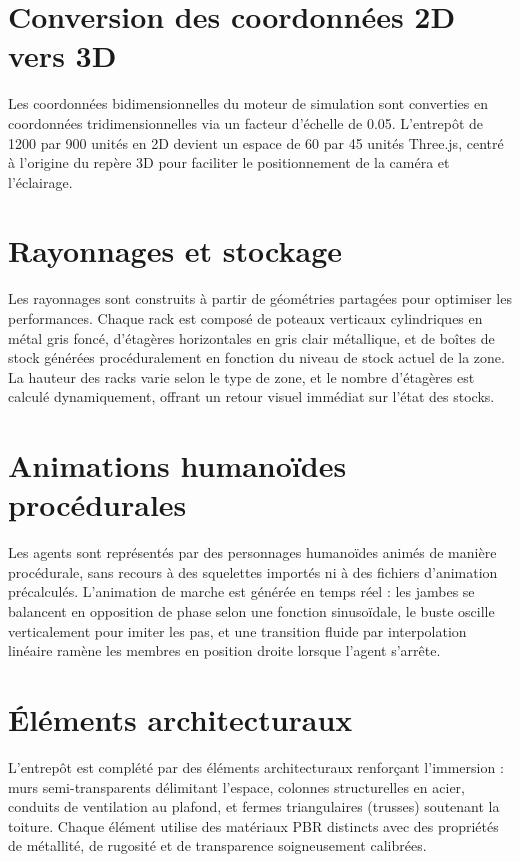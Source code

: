 \documentclass[12pt,a4paper]{report}
\begin{document}
\section{Conversion des coordonn\'ees 2D vers 3D}

Les coordonn\'ees bidimensionnelles du moteur de simulation sont converties en coordonn\'ees tridimensionnelles via un facteur d'\'echelle de 0.05. L'entrep\^ot de 1200 par 900 unit\'es en 2D devient un espace de 60 par 45 unit\'es Three.js, centr\'e \`a l'origine du rep\`ere 3D pour faciliter le positionnement de la cam\'era et l'\'eclairage.

\section{Rayonnages et stockage}

Les rayonnages sont construits \`a partir de g\'eom\'etries partag\'ees pour optimiser les performances. Chaque rack est compos\'e de poteaux verticaux cylindriques en m\'etal gris fonc\'e, d'\'etag\`eres horizontales en gris clair m\'etallique, et de bo\^ites de stock g\'en\'er\'ees proc\'eduralement en fonction du niveau de stock actuel de la zone. La hauteur des racks varie selon le type de zone, et le nombre d'\'etag\`eres est calcul\'e dynamiquement, offrant un retour visuel imm\'ediat sur l'\'etat des stocks.

\section{Animations humano\"ides proc\'edurales}

Les agents sont repr\'esent\'es par des personnages humano\"ides anim\'es de mani\`ere proc\'edurale, sans recours \`a des squelettes import\'es ni \`a des fichiers d'animation pr\'ecalcul\'es. L'animation de marche est g\'en\'er\'ee en temps r\'eel : les jambes se balancent en opposition de phase selon une fonction sinuso\"idale, le buste oscille verticalement pour imiter les pas, et une transition fluide par interpolation lin\'eaire ram\`ene les membres en position droite lorsque l'agent s'arr\^ete.

\section{\'El\'ements architecturaux}

L'entrep\^ot est compl\'et\'e par des \'el\'ements architecturaux renfor\c{c}ant l'immersion : murs semi-transparents d\'elimitant l'espace, colonnes structurelles en acier, conduits de ventilation au plafond, et fermes triangulaires (trusses) soutenant la toiture. Chaque \'el\'ement utilise des mat\'eriaux PBR distincts avec des propri\'et\'es de m\'etallit\'e, de rugosit\'e et de transparence soigneusement calibr\'ees.
\end{document}

